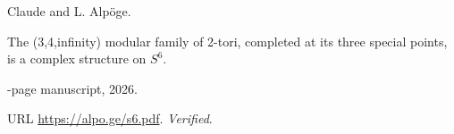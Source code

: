 {Claude} and {L. Alp{\"o}ge}.

\newblock The (3,4,infinity) modular family of 2-tori, completed at its three
  special points, is a complex structure on {$S^6$}.

-page manuscript, 2026.

\newblock URL \url{https://alpo.ge/s6.pdf}.
\newblock \emph{Verified}.

